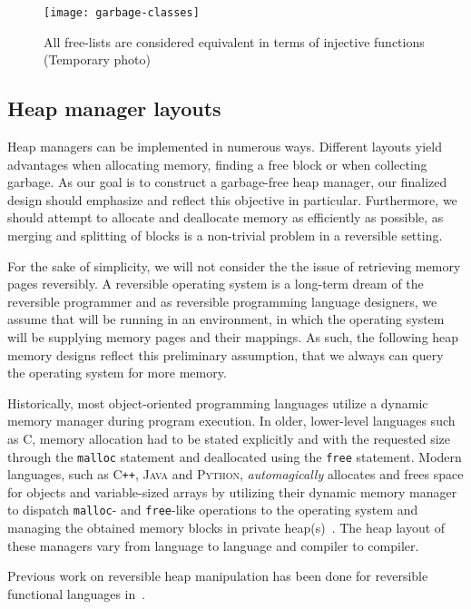 \begin{figure}[ht]
\centering
\texttt{[image: garbage-classes]}
\caption{All free-lists are considered equivalent in terms of injective functions (Temporary photo)}
\label{fig:equivalent-free-lists}
\end{figure}


\subsection{Heap manager layouts}
\label{subsec-heap-manager-layout}
Heap managers can be implemented in numerous ways. Different layouts yield advantages when allocating memory, finding a free block or when collecting garbage. As our goal is to construct a garbage-free heap manager, our finalized design should emphasize and reflect this objective in particular. Furthermore, we should attempt to allocate and deallocate memory as efficiently as possible, as merging and splitting of blocks is a non-trivial problem in a reversible setting.

For the sake of simplicity, we will not consider the the issue of retrieving memory pages reversibly. A reversible operating system is a long-term dream of the reversible programmer and as reversible programming language designers, we assume that \rooplpp will be running in an environment, in which the operating system will be supplying memory pages and their mappings. As such, the following heap memory designs reflect this preliminary assumption, that we always can query the operating system for more memory. 

Historically, most object-oriented programming languages utilize a dynamic memory manager during program execution. In older, lower-level languages such as \textsc{C}, memory allocation had to be stated explicitly and with the requested size through the \texttt{malloc} statement and deallocated using the \texttt{free} statement. Modern languages, such as \textsc{C\texttt{++}}, \textsc{Java} and \textsc{Python}, \textit{automagically} allocates and frees space for objects and variable-sized arrays by utilizing their dynamic memory manager to dispatch \texttt{malloc}- and \texttt{free}-like operations to the operating system and managing the obtained memory blocks in private heap(s)~\cite{wh:cpp_memory, bv:jvm, py:memory}. The heap layout of these managers vary from language to language and compiler to compiler.

Previous work on reversible heap manipulation has been done for reversible functional languages in~\cite{ha:heap, jsk:translation, tm:garbage}.

